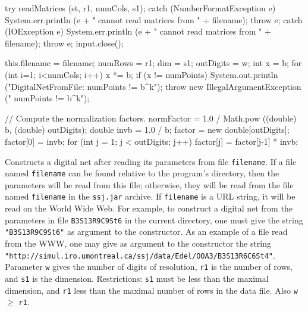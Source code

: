 \begin{code}
\begin{hide}
{      try {
         readMatrices (st, r1, numCols, s1);
      } catch (NumberFormatException e) {
         System.err.println (e + "   cannot read matrices from " + filename);
         throw e;
      }  catch (IOException e) {
         System.err.println (e + "   cannot read matrices from  " + filename);
         throw e;
      }
      input.close();

      this.filename = filename;
      numRows = r1;
      dim = s1;
      outDigits = w;
      int x = b;
      for (int i=1; i<numCols; i++) x *= b;
      if (x != numPoints) {
         System.out.println ("DigitalNetFromFile:   numPoints != b^k");
         throw new IllegalArgumentException (" numPoints != b^k");
      }

      // Compute the normalization factors.
      normFactor = 1.0 / Math.pow ((double) b, (double) outDigits);
      double invb = 1.0 / b;
      factor = new double[outDigits];
      factor[0] = invb;
      for (int j = 1; j < outDigits; j++)
         factor[j] = factor[j-1] * invb;
  }\end{hide}
\end{code}
\begin{tabb}
    Constructs a digital net after reading its parameters from file
    {\texttt{filename}}. If a file named \texttt{filename}
   can be found relative to the program's directory, then the parameters
   will be read from this file; otherwise, they will be read from the file
   named  \texttt{filename} in the \texttt{ssj.jar} archive.
   If {\texttt{filename}} is a URL string, it will be read on
   the World Wide Web.
   For example, to construct a digital net from the parameters in file
   \texttt{B3S13R9C9St6} in the current directory,  one must give the string
   \texttt{"B3S13R9C9St6"} as argument to the constructor.
   As an example of a file read from the WWW, one may give
   as argument to the constructor the string
   \texttt{
  "http://simul.iro.umontreal.ca/ssj/data/Edel/OOA3/B3S13R6C6St4"}.
   Parameter \texttt{w} gives the number of digits of resolution, \texttt{r1} is
   the number of rows, and \texttt{s1} is the dimension.
   Restrictions: \texttt{s1} must be less than the maximal dimension, and
   \texttt{r1} less than the maximal number of rows in the data file.
   Also \texttt{w} $\ge$ \texttt{r1}.
\end{tabb}
\begin{htmlonly}
\end{htmlonly}

